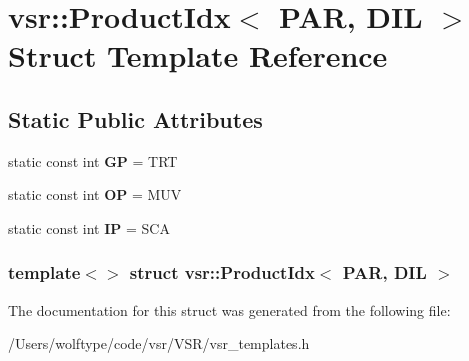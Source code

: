\hypertarget{structvsr_1_1_product_idx_3_01_p_a_r_00_01_d_i_l_01_4}{\section{vsr\-:\-:Product\-Idx$<$ P\-A\-R, D\-I\-L $>$ Struct Template Reference}
\label{structvsr_1_1_product_idx_3_01_p_a_r_00_01_d_i_l_01_4}
}
\subsection*{Static Public Attributes}
\begin{DoxyCompactItemize}
\item 
\hypertarget{structvsr_1_1_product_idx_3_01_p_a_r_00_01_d_i_l_01_4_a0bc5c327c9b0630567e62d45c2c2a9b3}{static const int {\bfseries G\-P} = T\-R\-T}\label{structvsr_1_1_product_idx_3_01_p_a_r_00_01_d_i_l_01_4_a0bc5c327c9b0630567e62d45c2c2a9b3}

\item 
\hypertarget{structvsr_1_1_product_idx_3_01_p_a_r_00_01_d_i_l_01_4_a98b5ef995c4d1f5ae0141a09e240ccf2}{static const int {\bfseries O\-P} = M\-U\-V}\label{structvsr_1_1_product_idx_3_01_p_a_r_00_01_d_i_l_01_4_a98b5ef995c4d1f5ae0141a09e240ccf2}

\item 
\hypertarget{structvsr_1_1_product_idx_3_01_p_a_r_00_01_d_i_l_01_4_a5eb51e451b794c571d61c4598c1f5dc5}{static const int {\bfseries I\-P} = S\-C\-A}\label{structvsr_1_1_product_idx_3_01_p_a_r_00_01_d_i_l_01_4_a5eb51e451b794c571d61c4598c1f5dc5}

\end{DoxyCompactItemize}
\subsubsection*{template$<$$>$ struct vsr\-::\-Product\-Idx$<$ P\-A\-R, D\-I\-L $>$}



The documentation for this struct was generated from the following file\-:\begin{DoxyCompactItemize}
\item 
/\-Users/wolftype/code/vsr/\-V\-S\-R/vsr\-\_\-templates.\-h\end{DoxyCompactItemize}

